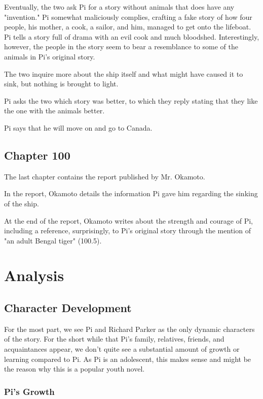 \documentclass[11pt]{article}
\begin{document}
Eventually, the two ask Pi for a story without animals that does have any "invention." Pi somewhat maliciously complies, crafting a fake story of how four people, his mother, a cook, a sailor, and him, managed to get onto the lifeboat. Pi tells a story full of drama with an evil cook and much bloodshed. Interestingly, however, the people in the story seem to bear a resemblance to some of the animals in Pi's original story.

The two inquire more about the ship itself and what might have caused it to sink, but nothing is brought to light.

Pi asks the two which story was better, to which they reply stating that they like the one with the animals better.

Pi says that he will move on and go to Canada.
\subsection{Chapter 100}
\label{sec:org3e7d77a}
The last chapter contains the report published by Mr. Okamoto.

In the report, Okamoto details the information Pi gave him regarding the sinking of the ship.

At the end of the report, Okamoto writes about the strength and courage of Pi, including a reference, surprisingly, to Pi's original story through the mention of "an adult Bengal tiger" (100.5).

\section{Analysis}
\label{sec:org284ff75}
\subsection{Character Development}
\label{sec:org76f5669}

For the most part, we see Pi and Richard Parker as the only dynamic characters of the story. For the short while that Pi's family, relatives, friends, and acquaintances appear, we don't quite see a substantial amount of growth or learning compared to Pi. As Pi is an adolescent, this makes sense and might be the reason why this is a popular youth novel.

\subsubsection{Pi's Growth}
\label{sec:org956b47d}
\end{document}
